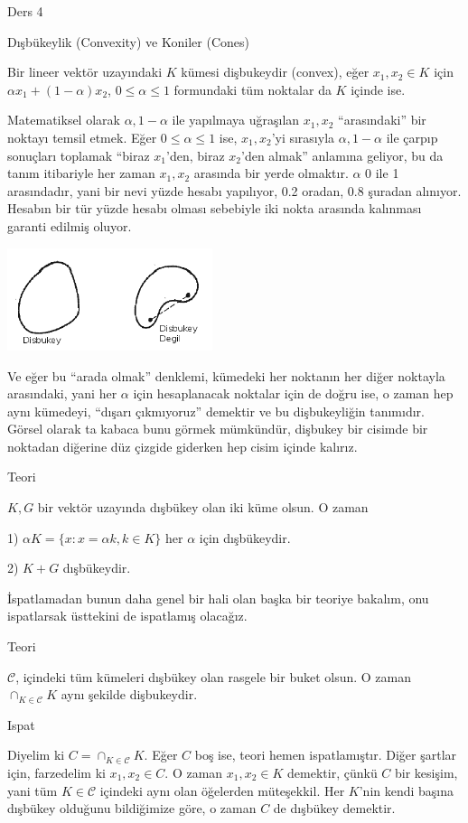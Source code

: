\documentclass[12pt,fleqn]{article}\usepackage{../../common}
\begin{document}
Ders 4

Dışbükeylik (Convexity) ve Koniler (Cones) 

Bir lineer vektör uzayındaki $K$ kümesi dişbukeydir (convex), eğer 
$x_1,x_2 \in K$ için $\alpha x_1 + (1-\alpha)x_2$, $0 \le \alpha \le 1$ formundaki
tüm noktalar da $K$ içinde ise.

Matematiksel olarak $\alpha,1-\alpha$ ile yapılmaya uğraşılan $x_1,x_2$
``arasındaki'' bir noktayı temsil etmek. Eğer $0 \le \alpha \le 1$ ise,
$x_1,x_2$'yi sırasıyla $\alpha,1-\alpha$ ile çarpıp sonuçları toplamak
``biraz $x_1$'den, biraz $x_2$'den almak'' anlamına geliyor, bu da tanım
itibariyle her zaman $x_1,x_2$ arasında bir yerde olmaktır. $\alpha$ 0 ile
1 arasındadır, yani bir nevi yüzde hesabı yapılıyor, 0.2 oradan, 0.8
şuradan alınıyor. Hesabın bir tür yüzde hesabı olması sebebiyle iki nokta
arasında kalınması garanti edilmiş oluyor. 

\includegraphics[height=3cm]{4_1.png}

Ve eğer bu ``arada olmak'' denklemi, kümedeki her noktanın her diğer
noktayla arasındaki, yani her $\alpha$ için hesaplanacak noktalar için de
doğru ise, o zaman hep aynı kümedeyi, ``dışarı çıkmıyoruz'' demektir ve bu
dişbukeyliğin tanımıdır. Görsel olarak ta kabaca bunu görmek mümkündür,
dişbukey bir cisimde bir noktadan diğerine düz çizgide giderken hep cisim
içinde kalırız.

Teori 

$K,G$ bir vektör uzayında dışbükey olan iki küme olsun. O zaman 

1) $\alpha K = \{x: x = \alpha k, k \in K\}$ her $\alpha$ için dışbükeydir. 

2) $K+G$ dışbükeydir. 

İspatlamadan bunun daha genel bir hali olan başka bir teoriye bakalım, onu
ispatlarsak üsttekini de ispatlamış olacağız. 

Teori 

$\mathscr{C}$, içindeki tüm kümeleri dışbükey olan rasgele bir buket
olsun. O zaman $\cap_{K \in \mathscr{C}}K$ aynı şekilde dişbukeydir. 

Ispat

Diyelim ki $C = \cap_{K \in \mathscr{C}}K$. Eğer $C$ boş ise, teori hemen
ispatlamıştır. Diğer şartlar için, farzedelim ki $x_1,x_2 \in C$. O zaman
$x_1,x_2 \in K$ demektir, çünkü $C$ bir kesişim, yani tüm $K \in \mathscr{C}$
içindeki aynı olan öğelerden müteşekkil. Her $K$'nin kendi başına dışbükey
olduğunu bildiğimize göre, o zaman $C$ de dışbükey demektir. 
\end{document}
